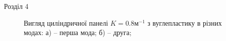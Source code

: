 \documentclass[8pt]{beamer}
\numberwithin{figure}{section}
\numberwithin{equation}{section}
\numberwithin{table}{section}
\begin{document}
\begin{frame}{Розділ 4}

\begin{figure}[h]
\begin{minipage}[h]{0.49\linewidth}
\end{minipage}
\hfill
\begin{minipage}[h]{0.49\linewidth}
\end{minipage}
\caption{Вигляд циліндричної панелі $K=0.8\text{м}^{-1}$ з вуглепластику в різних модах: а) – перша мода; б) – друга;}
\end{figure}

\end{frame}
\end{document}
